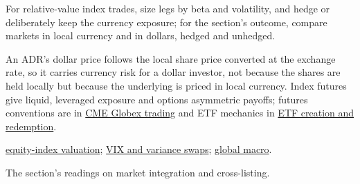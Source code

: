 \begin{qfdefinition}
 For relative-value index trades, size legs by beta and volatility, and hedge or deliberately keep the currency exposure; for the section's outcome, compare markets in local currency and in dollars, hedged and unhedged.

 An ADR's dollar price follows the local share price converted at the exchange rate, so it carries currency risk for a dollar investor, not because the shares are held locally but because the underlying is priced in local currency. Index futures give liquid, leveraged exposure and options asymmetric payoffs; futures conventions are in \hyperref[conv:cme-globex-trading]{CME Globex trading} and ETF mechanics in \hyperref[mech:etf-creation-redemption]{ETF creation and redemption}.

 \hyperref[meth:equity-index-valuation]{equity-index valuation}; \hyperref[def:vix-variance-dividend-swaps]{VIX and variance swaps}; \hyperref[def:global-macro-strategy]{global macro}.

 The section's readings on market integration and cross-listing.

\end{qfdefinition}
